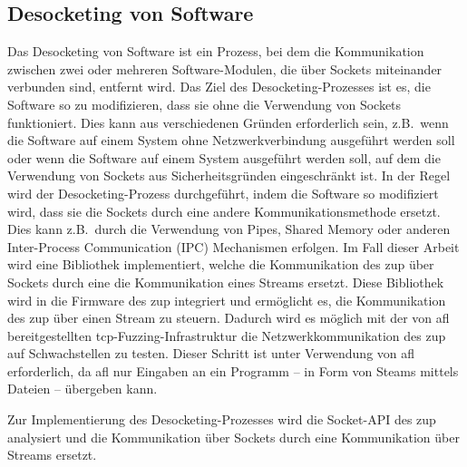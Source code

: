 
\subsection{Desocketing von Software}\label{subsec:desocketing-von-software}
Das Desocketing von Software ist ein Prozess, bei dem die Kommunikation zwischen zwei oder mehreren Software-Modulen,
die über Sockets miteinander verbunden sind, entfernt wird.
Das Ziel des Desocketing-Prozesses ist es, die Software so zu modifizieren, dass sie ohne die Verwendung von Sockets funktioniert.
Dies kann aus verschiedenen Gründen erforderlich sein, z.B.\ wenn die Software auf einem System ohne Netzwerkverbindung ausgeführt werden soll
oder wenn die Software auf einem System ausgeführt werden soll, auf dem die Verwendung von Sockets aus Sicherheitsgründen eingeschränkt ist.
In der Regel wird der Desocketing-Prozess durchgeführt, indem die Software so modifiziert wird, dass sie die Sockets durch eine andere
Kommunikationsmethode ersetzt.
Dies kann z.B.\ durch die Verwendung von Pipes, Shared Memory oder anderen Inter-Process Communication (IPC) Mechanismen erfolgen. \newline
Im Fall dieser Arbeit wird eine Bibliothek implementiert, welche die Kommunikation des \gls{zup} über Sockets durch eine
die Kommunikation eines Streams ersetzt.
Diese Bibliothek wird in die Firmware des \gls{zup} integriert und ermöglicht es, die Kommunikation des \gls{zup} über
einen Stream zu steuern.
Dadurch wird es möglich mit der von \gls{afl} bereitgestellten \gls{tcp}-Fuzzing-Infrastruktur die Netzwerkkommunikation
des \gls{zup} auf Schwachstellen zu testen.
Dieser Schritt ist unter Verwendung von \gls{afl} erforderlich, da \gls{afl} nur Eingaben an ein Programm -- in Form
von Steams mittels Dateien -- übergeben kann.\newline

\noindent Zur Implementierung des Desocketing-Prozesses wird die Socket-API des \gls{zup} analysiert und die Kommunikation über Sockets
durch eine Kommunikation über Streams ersetzt.

